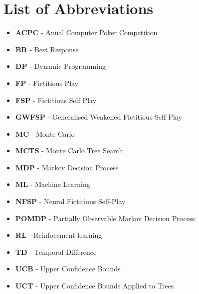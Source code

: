 \pagebreak

\section*{List of Abbreviations}\label{sec:listOfAbbreviations}

\begin{itemize}
    \item \textbf{ACPC} - Anual Computer Poker Competition
    \item \textbf{BR} - Best Response
    \item \textbf{DP} - Dynamic Programming
    \item \textbf{FP} - Fictitious Play
    \item \textbf{FSP} - Fictitious Self Play
    \item \textbf{GWFSP} - Generalised Weakened Fictitious Self Play
    \item \textbf{MC} - Monte Carlo
    \item \textbf{MCTS} - Monte Carlo Tree Search
    \item \textbf{MDP} - Markov Decision Process
    \item \textbf{ML} - Machine Learning
    \item \textbf{NFSP} - Neural Fictitious Self-Play
    \item \textbf{POMDP} - Partially Observable Markov Decision Process
    \item \textbf{RL} - Reinfocement learning
    \item \textbf{TD} - Temporal Difference
    \item \textbf{UCB} - Upper Confidence Bounds
    \item \textbf{UCT} - Upper Confidence Bounds Applied to Trees
\end{itemize}